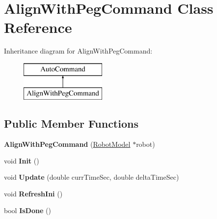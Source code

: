 \hypertarget{class_align_with_peg_command}{}\section{Align\+With\+Peg\+Command Class Reference}
\label{class_align_with_peg_command}
Inheritance diagram for Align\+With\+Peg\+Command\+:\begin{figure}[H]
\begin{center}
\leavevmode
\includegraphics[height=2.000000cm]{class_align_with_peg_command}
\end{center}
\end{figure}
\subsection*{Public Member Functions}
\begin{DoxyCompactItemize}
\item 
\mbox{\label{class_align_with_peg_command_a8aaab261d5c6e5bbbd603378b900e0c1}} 
{\bfseries Align\+With\+Peg\+Command} (\hyperlink{class_robot_model}{Robot\+Model} $\ast$robot)
\item 
\mbox{\label{class_align_with_peg_command_aec3a26a2f33ac872b551f8ae0e69016e}} 
void {\bfseries Init} ()
\item 
\mbox{\label{class_align_with_peg_command_a718e94b95fb192cf1e770e8af32dc616}} 
void {\bfseries Update} (double curr\+Time\+Sec, double delta\+Time\+Sec)
\item 
\mbox{\label{class_align_with_peg_command_a6f7b67c385b45154eef57703f242a4b3}} 
void {\bfseries Refresh\+Ini} ()
\item 
\mbox{\label{class_align_with_peg_command_aba9bae73047f3c752ab0e401dcb8eb77}} 
bool {\bfseries Is\+Done} ()
\end{DoxyCompactItemize}
